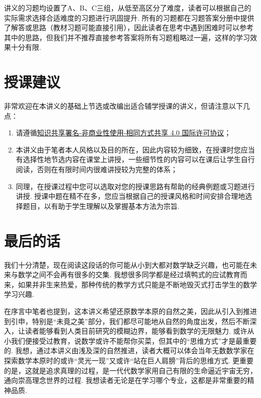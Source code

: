 讲义的习题均设置了A、B、C三组，从低至高区分了难度，读者可以根据自己的实际需求选择合适难度的习题进行巩固提升. 所有的习题都在习题答案分册中提供了解答或思路（教材习题可能直接引用），因此读者在思考中遇到困难时可以参考其中的思路，但我们并不推荐直接参考答案将所有习题粗略过一遍，这样的学习效果十分有限.

\section*{授课建议}

非常欢迎在本讲义的基础上节选或改编出适合辅学授课的讲义，但请注意以下几点：
\begin{enumerate}
    \item 请遵循\href{https://creativecommons.org/licenses/by-nc-sa/4.0/deed.zh}{知识共享署名-非商业性使用-相同方式共享 4.0 国际许可协议}；

    \item 本讲义由于笔者本人风格以及目的所在，因此内容较为细致，在授课时您应当有选择性地节选内容在课堂上讲授，一些细节性的内容可以在课后让学生自行阅读，否则在有限时间内很难讲授较为完整的体系；

    \item 同理，在授课过程中您可以选取对您的授课思路有帮助的经典例题或习题进行讲授. 授课中题在精不在多，您应当根据自己的授课风格和时间安排合理地选择题目，以有助于学生理解以及掌握基本方法为宗旨.
\end{enumerate}

\section*{最后的话}

我们十分清楚，现在阅读这段话的你可能从小到大都对数学缺乏兴趣，也可能在未来与数学之间不会再有很多的交集. 我想很多同学都是经过填鸭式的应试教育而来，如果并非生来热爱，那种传统的教学方式只能是不断地毁灭式打击学生的数学学习兴趣.

在序言中笔者也提到，这本讲义希望还原数学本原的自然之美，因此从引入到推进到引申，特别是``未竟之美''部分，我们都尽可能地从自然的角度出发，然后不断深入，让读者能够看到人类目前研究的模糊边界，能够看到数学的无限魅力. 或许从小我们便接受过教育，说数学或许不能帮你买菜，但其中的``思维方式''才是最重要的. 我想，通过本讲义由浅及深的自然推进，读者大概可以体会当年无数数学家在探索数学本原时的或许``灵光一现''又或许``站在巨人肩膀''背后的思维方式. 更重要的是，这就是追求真理的过程，是一代代数学家用自己有限的生命逼近宇宙无穷，通向崇高理念世界的过程. 我想读者无论是在学习哪个专业，这都是非常重要的精神品质.

